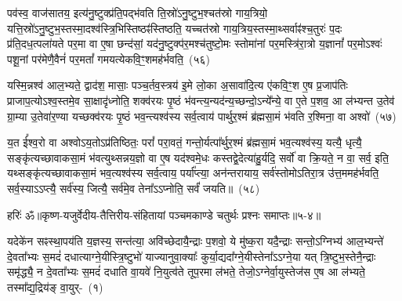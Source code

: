 {}%

पव॑स्व॒ वाज॑सातय॒ इत्य॑नु॒ष्टुक्प्र॑ति॒पद्भ॑वति ति॒स्रो॑\-ऽनु॒ष्टुभ॒श्चत॑स्रो गाय॒त्रियो॒ यत्ति॒स्रो॑\-ऽनु॒ष्टुभ॒स्तस्मा॒दश्व॑स्त्रि॒भिस्तिष्ठꣴ॑स्तिष्ठति॒ यच्चत॑स्रो गाय॒त्रिय॒स्तस्मा॒थ्सर्वाꣴ॑श्च॒तुरः॑ प॒दः प्र॑ति॒दध॒त्\-पला॑यते पर॒मा वा ए॒षा छन्द॑सां॒ यद॑नु॒ष्टुक्प॑र॒मश्च॑तुष्टो॒मः स्तोमा॑नां पर॒मस्त्रि॑रा॒त्रो य॒ज्ञानां᳚ पर॒मो\-ऽश्वः॑ पशू॒नां पर॑मेणै॒वैनं॑ पर॒मतां᳚ गमयत्येकवि॒ꣳ॒शमह॑र्भवति॒~(५६)\ip

यस्मि॒न्नश्व॑ आल॒भ्यते॒ द्वाद॑श॒ मासाः॒ पञ्च॒र्तव॒स्त्रय॑ इ॒मे लो॒का अ॒सावा॑दि॒त्य ए॑कवि॒ꣳ॒श ए॒ष प्र॒जा\-प॑तिः प्राजाप॒त्यो\-ऽश्व॒स्तमे॒व सा॒क्षादृ॑ध्नोति॒ शक्व॑रयः पृ॒ष्ठं भ॑वन्त्य॒न्यद॑न्य॒च्छन्दो॒\-ऽन्ये᳚न्ये॒ वा ए॒ते प॒शव॒ आ ल॑भ्यन्त उ॒तेव॑ ग्रा॒म्या उ॒तेवा॑र॒ण्या यच्छक्व॑रयः पृ॒ष्ठं भव॒न्त्यश्व॑स्य सर्व॒त्वाय॑ पार्थुर॒श्मं ब्र॑ह्मसा॒मं भ॑वति र॒श्मिना॒ वा अश्वो॑~(५७)\ip

य॒त ई᳚श्व॒रो वा अश्वो\-ऽय॒तो\-ऽप्र॑तिष्ठितः॒ परां᳚ परा॒वतं॒ गन्तो॒र्यत्पा᳚र्थुर॒श्मं ब्र॑ह्मसा॒मं भव॒त्यश्व॑स्य॒ यत्यै॒ धृत्यै॒ सङ्कृ॑त्यच्छावाकसा॒मं भ॑वत्युथ्सन्नय॒ज्ञो वा ए॒ष यद॑श्वमे॒धः कस्तद्वे॒देत्या॑हु॒र्यदि॒ सर्वो॑ वा क्रि॒यते॒ न वा॒ सर्व॒ इति॒ यथ्सङ्कृ॑त्यच्छावाकसा॒मं भव॒त्यश्व॑स्य सर्व॒त्वाय॒ पर्या᳚प्त्या॒ अन॑न्तरायाय॒ सर्व॑स्तोमो\-ऽतिरा॒त्र उ॑त्त॒ममह॑र्भवति॒ सर्व॒स्या\-ऽऽप्त्यै॒ सर्व॑स्य॒ जित्यै॒ सर्व॑मे॒व तेना᳚\-ऽऽ\-प्नोति॒ सर्वं॑ जयति॥~(५८)\ip

{}%

{हरिः॑ ॐ}{॥कृष्ण-यजुर्वेदीय-तैत्तिरीय-संहितायां पञ्चमकाण्डे चतुर्थः प्रश्नः समाप्तः॥५-४॥}



\setcounter{anuvakam}{0}
यदेके॑न सꣴस्था॒पय॑ति य॒ज्ञस्य॒ सन्त॑त्या॒ अवि॑च्छेदायै॒न्द्राः प॒शवो॒ ये मु॑ष्क॒रा यदै॒न्द्राः सन्तो॒\-ऽग्निभ्य॑ आल॒भ्यन्ते॑ दे॒वता᳚भ्यः स॒मदं॑ दधात्याग्ने॒यीस्त्रि॒ष्टुभो॑ याज्यानुवा॒क्याः᳚ कुर्या॒द्यदा᳚ग्ने॒यीस्तेना᳚\-ऽऽग्ने॒या यत् त्रि॒ष्टुभ॒स्तेनै॒न्द्राः समृ॑द्ध्यै॒ न दे॒वता᳚भ्यः स॒मदं॑ दधाति वा॒यवे॑ नि॒युत्व॑ते तूप॒रमा ल॑भते॒ तेजो॒\-ऽग्नेर्वा॒युस्तेज॑स ए॒ष आ ल॑भ्यते॒ तस्मा᳚द्\-य॒द्रिय॑ङ् वा॒युर्-~(१)\ip

